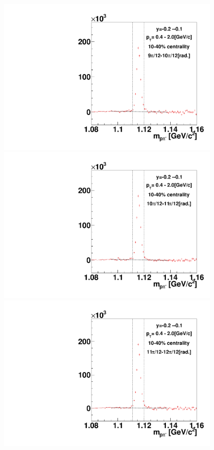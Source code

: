 \begin{figure}[h]
\includegraphics[width=0.14\linewidth]{chapterX/fig/ld_v1_sig/kf_ptslice0_cent1_ld_flow_phi10_rap6.pdf}
\includegraphics[width=0.14\linewidth]{chapterX/fig/ld_v1_sig/kf_ptslice0_cent1_ld_flow_phi11_rap6.pdf}
\includegraphics[width=0.14\linewidth]{chapterX/fig/ld_v1_sig/kf_ptslice0_cent1_ld_flow_phi12_rap6.pdf}


\end{figure}

